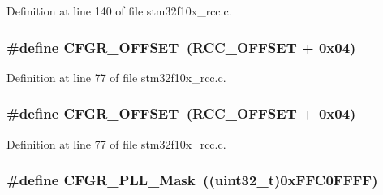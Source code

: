 Definition at line 140 of file stm32f10x\+\_\+rcc.\+c.

\subsubsection[{\texorpdfstring{C\+F\+G\+R\+\_\+\+O\+F\+F\+S\+ET}{CFGR_OFFSET}}]{\setlength{\rightskip}{0pt plus 5cm}\#define C\+F\+G\+R\+\_\+\+O\+F\+F\+S\+ET~({\bf R\+C\+C\+\_\+\+O\+F\+F\+S\+ET} + 0x04)}\hypertarget{group___r_c_c___private___defines_ga8682298330c3b9bae1992e4f1a0af985}{}\label{group___r_c_c___private___defines_ga8682298330c3b9bae1992e4f1a0af985}


Definition at line 77 of file stm32f10x\+\_\+rcc.\+c.

\subsubsection[{\texorpdfstring{C\+F\+G\+R\+\_\+\+O\+F\+F\+S\+ET}{CFGR_OFFSET}}]{\setlength{\rightskip}{0pt plus 5cm}\#define C\+F\+G\+R\+\_\+\+O\+F\+F\+S\+ET~({\bf R\+C\+C\+\_\+\+O\+F\+F\+S\+ET} + 0x04)}\hypertarget{group___r_c_c___private___defines_ga8682298330c3b9bae1992e4f1a0af985}{}\label{group___r_c_c___private___defines_ga8682298330c3b9bae1992e4f1a0af985}


Definition at line 77 of file stm32f10x\+\_\+rcc.\+c.

\subsubsection[{\texorpdfstring{C\+F\+G\+R\+\_\+\+P\+L\+L\+\_\+\+Mask}{CFGR_PLL_Mask}}]{\setlength{\rightskip}{0pt plus 5cm}\#define C\+F\+G\+R\+\_\+\+P\+L\+L\+\_\+\+Mask~(({\bf uint32\+\_\+t})0x\+F\+F\+C0\+F\+F\+F\+F)}\hypertarget{group___r_c_c___private___defines_gaea605b2eaea5332218130fc2d20d917c}{}\label{group___r_c_c___private___defines_gaea605b2eaea5332218130fc2d20d917c}


